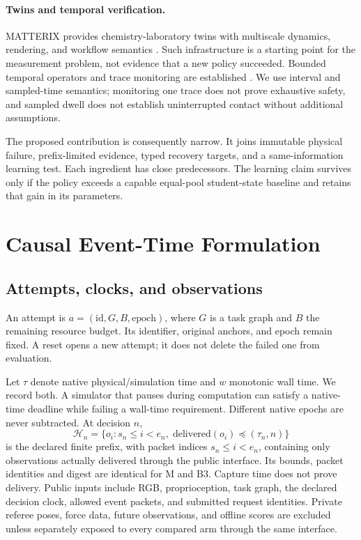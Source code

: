 \documentclass{article}
\newcommand{\Hist}{\mathcal{H}}
\begin{document}
\paragraph{Twins and temporal verification.}
MATTERIX provides chemistry-laboratory twins with multiscale dynamics, rendering, and workflow semantics \citep{darvish2026matterix}. Such infrastructure is a starting point for the measurement problem, not evidence that a new policy succeeded. Bounded temporal operators and trace monitoring are established \citep{maler2004stl}. We use interval and sampled-time semantics; monitoring one trace does not prove exhaustive safety, and sampled dwell does not establish uninterrupted contact without additional assumptions.

The proposed contribution is consequently narrow. It joins immutable physical failure, prefix-limited evidence, typed recovery targets, and a same-information learning test. Each ingredient has close predecessors. The learning claim survives only if the policy exceeds a capable equal-pool student-state baseline and retains that gain in its parameters.

\section{Causal Event-Time Formulation}
\subsection{Attempts, clocks, and observations}
An attempt is \(a=(\mathrm{id},G,B,\mathrm{epoch})\), where \(G\) is a task graph and \(B\) the remaining resource budget. Its identifier, original anchors, and epoch remain fixed. A reset opens a new attempt; it does not delete the failed one from evaluation.

Let \(\tau\) denote native physical/simulation time and \(w\) monotonic wall time. We record both. A simulator that pauses during computation can satisfy a native-time deadline while failing a wall-time requirement. Different native epochs are never subtracted. At decision \(n\),
\begin{equation}
\Hist_n=\{o_i:s_n\le i<e_n,\;\mathrm{delivered}(o_i)\preceq(\tau_n,n)\}
\label{eq:history}
\end{equation}
is the declared finite prefix, with packet indices $s_n\le i<e_n$, containing only observations actually delivered through the public interface. Its bounds, packet identities and digest are identical for M and B3. Capture time does not prove delivery. Public inputs include RGB, proprioception, task graph, the declared decision clock, allowed event packets, and submitted request identities. Private referee poses, force data, future observations, and offline scores are excluded unless separately exposed to every compared arm through the same interface.
\end{document}
